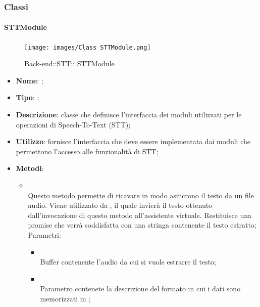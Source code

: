 \subsubsection{Classi}
\hypertarget{ STTModule_label}{\paragraph{ STTModule}}
\begin{figure}[h]
	\centering
	\texttt{[image: images/Class STTModule.png]}
	\caption{Back-end::STT:: STTModule}
\end{figure}
\begin{itemize}
	\item \textbf{Nome}: ;
	\item \textbf{Tipo}: ;
	\item \textbf{Descrizione}: classe che definisce l'interfaccia dei moduli utilizzati per le operazioni di Speech-To-Text (STT);
	\item \textbf{Utilizzo}: fornisce l'interfaccia che deve essere implementata dai moduli che permettono l'accesso alle funzionalità di STT;
	\item \textbf{Metodi}:
	\begin{itemize}
		\item[]  \\
		Questo metodo permette di ricavare in modo asincrono il testo da un file audio. Viene utilizzato da , il quale invierà il testo ottenuto dall'invocazione di questo metodo all'assistente virtuale. Restituisce una promise che verrà soddisfatta con una stringa contenente il testo estratto;\\
		Parametri:
		\begin{itemize}
			\item {} \\
			Buffer contenente l'audio da cui si vuole estrarre il testo;
			\item {} \\
			Parametro contenete la descrizione del formato in cui i dati sono memorizzati in ;
		\end{itemize}
	\end{itemize}
\end{itemize}

